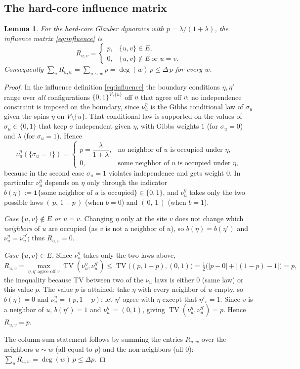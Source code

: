 \documentclass{amsart}
\newtheorem{lemma}{Lemma}
\DeclareMathOperator{\TV}{TV}
\begin{document}
\subsection{The hard-core influence matrix}
\begin{lemma}\label{lem:hardcore}
For the hard-core Glauber dynamics with $p=\lambda/(1+\lambda)$, the influence
matrix \eqref{eq:influence} is
\[
R_{u,v}=
\begin{cases}
p, & \{u,v\}\in E,\\
0, & \{u,v\}\notin E\ \text{or }u=v .
\end{cases}
\]
Consequently $\sum_{u} R_{u,w}=\sum_{u\sim w} p=\deg(w)\,p\le\Delta\,p$ for every
$w$.
\end{lemma}
\begin{proof}
In the influence definition \eqref{eq:influence} the boundary conditions
$\eta,\eta'$ range over \emph{all} configurations $\{0,1\}^{V\setminus\{u\}}$ off
$u$ that agree off $v$; no independence constraint is imposed on the boundary,
since $\nu_u^{\eta}$ is the Gibbs conditional law of $\sigma_u$ given the spins
$\eta$ on $V\setminus\{u\}$. That conditional law is supported on the values of
$\sigma_u\in\{0,1\}$ that keep $\sigma$ independent given $\eta$, with Gibbs
weights $1$ (for $\sigma_u=0$) and $\lambda$ (for $\sigma_u=1$). Hence
\[
\nu_u^{\eta}(\{\sigma_u=1\})=
\begin{cases}
p=\dfrac{\lambda}{1+\lambda}, & \text{no neighbor of $u$ is occupied under $\eta$},\\[4pt]
0, & \text{some neighbor of $u$ is occupied under $\eta$,}
\end{cases}
\]
because in the second case $\sigma_u=1$ violates independence and gets weight $0$.
In particular $\nu_u^{\eta}$ depends on $\eta$ only through the indicator
$b(\eta):=\mathbf 1\{\text{some neighbor of $u$ is occupied}\}\in\{0,1\}$, and
$\nu_u^{\eta}$ takes only the two possible laws $(\,p,\,1-p\,)$ (when $b=0$) and
$(\,0,\,1\,)$ (when $b=1$).

\smallskip
\emph{Case $\{u,v\}\notin E$ or $u=v$.} Changing $\eta$ only at the site $v$ does
not change which \emph{neighbors} of $u$ are occupied (as $v$ is not a neighbor of
$u$), so $b(\eta)=b(\eta')$ and $\nu_u^{\eta}=\nu_u^{\eta'}$; thus $R_{u,v}=0$.

\smallskip
\emph{Case $\{u,v\}\in E$.} Since $\nu_u^{\eta}$ takes only the two laws above,
\[
R_{u,v}=\max_{\eta,\eta'\ \text{agree off }v}\TV(\nu_u^{\eta},\nu_u^{\eta'})
\le\TV\big((p,1-p),(0,1)\big)
=\tfrac12\big(|p-0|+|(1-p)-1|\big)=p,
\]
the inequality because TV between two of the $\nu_u$ laws is either $0$ (same
law) or this value $p$. The value $p$ is attained: take $\eta$ with every
neighbor of $u$ empty, so $b(\eta)=0$ and $\nu_u^{\eta}=(p,1-p)$; let $\eta'$
agree with $\eta$ except that $\eta'_v=1$. Since $v$ is a neighbor of $u$,
$b(\eta')=1$ and $\nu_u^{\eta'}=(0,1)$, giving
$\TV(\nu_u^{\eta},\nu_u^{\eta'})=p$. Hence $R_{u,v}=p$.

\smallskip
The column-sum statement follows by summing the entries $R_{u,w}$ over the
neighbors $u\sim w$ (all equal to $p$) and the non-neighbors (all $0$):
$\sum_u R_{u,w}=\deg(w)\,p\le\Delta p$.
\end{proof}
\end{document}
